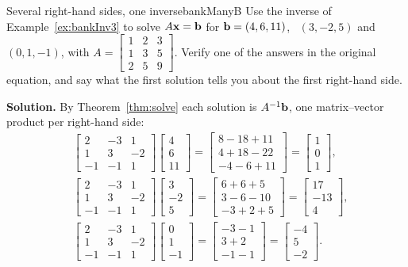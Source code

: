 \documentclass[11pt]{article}
\begin{document}
\begin{exmp}{Several right-hand sides, one inverse}{bankManyB}
Use the inverse of Example~\ref{ex:bankInv3} to solve $A\mathbf{x}=\mathbf{b}$ for $\mathbf{b}=(4,6,11)$, \ $(3,-2,5)$ and \ $(0,1,-1)$, with $A=\begin{bmatrix}1&2&3\\1&3&5\\2&5&9\end{bmatrix}$. Verify one of the answers in the original equation, and say what the first solution tells you about the first right-hand side.

\textbf{Solution.} By Theorem~\ref{thm:solve} each solution is $A^{-1}\mathbf{b}$, one matrix--vector product per right-hand side:
\begin{align*}
&\begin{bmatrix}2&-3&1\\1&3&-2\\-1&-1&1\end{bmatrix}\begin{bmatrix}4\\6\\11\end{bmatrix}=\begin{bmatrix}8-18+11\\4+18-22\\-4-6+11\end{bmatrix}=\begin{bmatrix}1\\0\\1\end{bmatrix},\\
&\begin{bmatrix}2&-3&1\\1&3&-2\\-1&-1&1\end{bmatrix}\begin{bmatrix}3\\-2\\5\end{bmatrix}=\begin{bmatrix}6+6+5\\3-6-10\\-3+2+5\end{bmatrix}=\begin{bmatrix}17\\-13\\4\end{bmatrix},\\
&\begin{bmatrix}2&-3&1\\1&3&-2\\-1&-1&1\end{bmatrix}\begin{bmatrix}0\\1\\-1\end{bmatrix}=\begin{bmatrix}-3-1\\3+2\\-1-1\end{bmatrix}=\begin{bmatrix}-4\\5\\-2\end{bmatrix}.

\end{align*}
\end{exmp}
\end{document}
